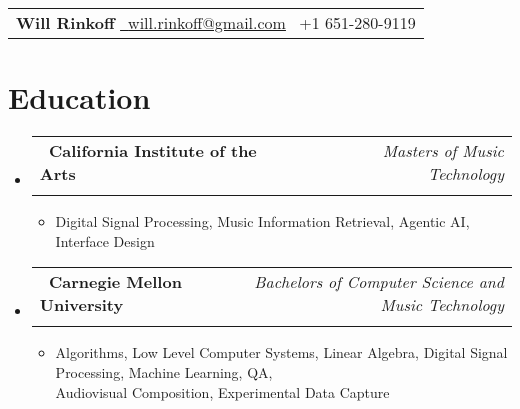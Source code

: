 \documentclass[a4paper,11pt]{article}
\makeatletter
\newcommand{\resumeSubheading}[4]{
\item
    \begin{tabular*}{0.98\textwidth}[t]{l@{\extracolsep{\fill}}r}
        \textbf{#1} & \textit{\footnotesize{#4}} \\
        \textit{\footnotesize{#3}} &  \footnotesize{#2}\\
    \end{tabular*}
    \vspace{-3mm}
}
\newcommand{\resumeSubHeadingListStart}{\begin{itemize}[leftmargin=*,labelsep=0mm]}
\newcommand{\resumeItemListStart}{\begin{justify}\begin{itemize}[leftmargin=3ex, rightmargin=2ex, noitemsep,labelsep=1.2mm,itemsep=0mm]\small}
\newcommand{\resumeSubHeadingListEnd}{\end{itemize}\vspace{2mm}}
\newcommand{\resumeItemListEnd}{\end{itemize}\end{justify}\vspace{-2mm}}
\newcommand{\name}{Will Rinkoff} %
\newcommand{\phone}{+1 651-280-9119} %
\newcommand{\emaila}{will.rinkoff@gmail.com} %
\makeatother
\begin{document}
\selectfont




\parbox{\dimexpr\linewidth-2.8cm\relax}{
\begin{tabularx}{\linewidth}{L} 
  \textbf{\Large \name} \href{mailto:\emaila}{\raisebox{0.0\height}{\footnotesize \faEnvelope}\ {\emaila}}
  \raisebox{0.0\height}{\footnotesize \faPhone}\ {\phone} \\
\end{tabularx}
}


\vspace{-3mm}

\section{\textbf{Education}}
  \resumeSubHeadingListStart
    \resumeSubheading
      {\ California Institute of the Arts}{}
      {}{Masters of Music Technology}
      \vspace{-3mm}
      \resumeItemListStart
        \item  
            \footnotesize {Digital Signal Processing, Music Information Retrieval, Agentic AI, Interface Design}
      \resumeItemListEnd
    \vspace{-3mm}
    \resumeSubheading
      {\ Carnegie Mellon University}{}
      {}{Bachelors of Computer Science and Music Technology}
      \vspace{-3mm}
      \resumeItemListStart
        \item 
            \footnotesize {Algorithms, Low Level Computer Systems, Linear Algebra, Digital Signal Processing, Machine Learning, QA, \\ Audiovisual Composition, Experimental Data Capture}
      \resumeItemListEnd
    \vspace{-3mm}
  \resumeSubHeadingListEnd
\vspace{-6mm}


\end{document}
